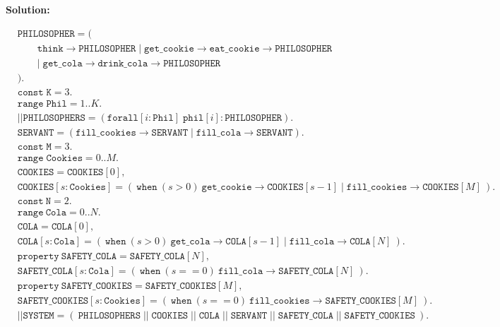 \documentclass{article}
\newenvironment{solution}{
	\vspace{0.4cm}\par\noindent\large\textbf{{Solution:}}\par\vspace{1em}
}{\vspace{0.1em}}
\begin{document}
\begin{solution}
	\begin{align*}
		&\mathtt{PHILOSOPHER} = ( \\
		&\qquad \mathtt{think} \rightarrow \mathtt{PHILOSOPHER} \; | \; \mathtt{get\_cookie} \rightarrow \mathtt{eat\_cookie} \rightarrow \mathtt{PHILOSOPHER} \\
		&\qquad | \; \mathtt{get\_cola} \rightarrow \mathtt{drink\_cola} \rightarrow \mathtt{PHILOSOPHER} \\
		&). \\
		&\mathtt{const} \; \mathtt{K} = 3. \\
		&\mathtt{range} \; \mathtt{Phil} = 1..K. \\
		&||\mathtt{PHILOSOPHERS} = (\mathtt{forall}[i:\mathtt{Phil}] \; \mathtt{phil}[i] : \mathtt{PHILOSOPHER}). \\
		&\mathtt{SERVANT} = (\mathtt{fill\_cookies} \rightarrow \mathtt{SERVANT} \; | \; \mathtt{fill\_cola} \rightarrow \mathtt{SERVANT}). \\
		&\mathtt{const} \; \mathtt{M} = 3. \\
		&\mathtt{range} \; \mathtt{Cookies} = 0..M. \\
		&\mathtt{COOKIES} = \mathtt{COOKIES}[0], \\
		&\mathtt{COOKIES}[s : \mathtt{Cookies}] = (\ \mathtt{when}\ (s > 0)\ \mathtt{get\_cookie} \rightarrow \mathtt{COOKIES}[s - 1]\; | \; \mathtt{fill\_cookies} \rightarrow \mathtt{COOKIES}[M]\ ). \\
		&\mathtt{const}\ \mathtt{N} = 2. \\
		&\mathtt{range}\ \mathtt{Cola} = 0..N. \\
		&\mathtt{COLA} = \mathtt{COLA}[0], \\
		&\mathtt{COLA}[s : \mathtt{Cola}] = (\ \mathtt{when}\ (s > 0)\ \mathtt{get\_cola} \rightarrow \mathtt{COLA}[s - 1]\; | \; \mathtt{fill\_cola} \rightarrow \mathtt{COLA}[N]\ ). \\
		&\mathtt{property}\ \mathtt{SAFETY\_COLA} = \mathtt{SAFETY\_COLA}[N], \\
		&\mathtt{SAFETY\_COLA}[s : \mathtt{Cola}] = (\ \mathtt{when}\ (s == 0)\ \mathtt{fill\_cola} \rightarrow \mathtt{SAFETY\_COLA}[N]\ ). \\
		&\mathtt{property}\ \mathtt{SAFETY\_COOKIES} = \mathtt{SAFETY\_COOKIES}[M], \\
		&\mathtt{SAFETY\_COOKIES}[s : \mathtt{Cookies}] = (\ \mathtt{when}\ (s == 0)\ \mathtt{fill\_cookies} \rightarrow \mathtt{SAFETY\_COOKIES}[M]\ ). \\
		&||\mathtt{SYSTEM} = (\ \mathtt{PHILOSOPHERS}\; ||\; \mathtt{COOKIES}\; ||\; \mathtt{COLA}\; ||\; \mathtt{SERVANT}\; ||\; \mathtt{SAFETY\_COLA}\; ||\; \mathtt{SAFETY\_COOKIES}\ ).
	\end{align*}
\end{solution}
\end{document}
